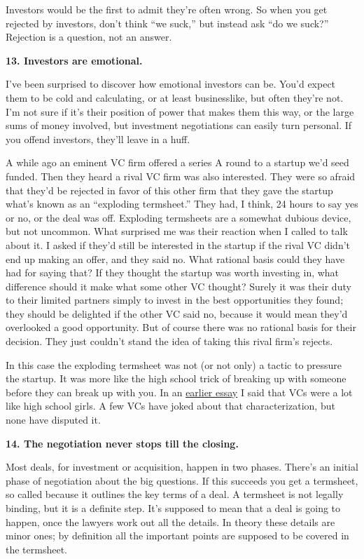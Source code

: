 \documentclass[12pt]{book}
\begin{document}
Investors would be the first to admit they're often wrong. So when you
get rejected by investors, don't think ``we suck,'' but instead ask ``do
we suck?'' Rejection is a question, not an answer.

\textbf{13. Investors are emotional.}

I've been surprised to discover how emotional investors can be. You'd
expect them to be cold and calculating, or at least businesslike, but
often they're not. I'm not sure if it's their position of power that
makes them this way, or the large sums of money involved, but investment
negotiations can easily turn personal. If you offend investors, they'll
leave in a huff.

A while ago an eminent VC firm offered a series A round to a startup
we'd seed funded. Then they heard a rival VC firm was also interested.
They were so afraid that they'd be rejected in favor of this other firm
that they gave the startup what's known as an ``exploding termsheet.''
They had, I think, 24 hours to say yes or no, or the deal was off.
Exploding termsheets are a somewhat dubious device, but not uncommon.
What surprised me was their reaction when I called to talk about it. I
asked if they'd still be interested in the startup if the rival VC
didn't end up making an offer, and they said no. What rational basis
could they have had for saying that? If they thought the startup was
worth investing in, what difference should it make what some other VC
thought? Surely it was their duty to their limited partners simply to
invest in the best opportunities they found; they should be delighted if
the other VC said no, because it would mean they'd overlooked a good
opportunity. But of course there was no rational basis for their
decision. They just couldn't stand the idea of taking this rival firm's
rejects.

In this case the exploding termsheet was not (or not only) a tactic to
pressure the startup. It was more like the high school trick of breaking
up with someone before they can break up with you. In an
\href{startupfunding.html}{earlier essay} I said that VCs were a lot
like high school girls. A few VCs have joked about that
characterization, but none have disputed it.

\textbf{14. The negotiation never stops till the closing.}

Most deals, for investment or acquisition, happen in two phases. There's
an initial phase of negotiation about the big questions. If this
succeeds you get a termsheet, so called because it outlines the key
terms of a deal. A termsheet is not legally binding, but it is a
definite step. It's supposed to mean that a deal is going to happen,
once the lawyers work out all the details. In theory these details are
minor ones; by definition all the important points are supposed to be
covered in the termsheet.
\end{document}
